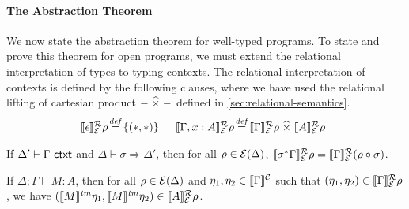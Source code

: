 \paragraph{The Abstraction Theorem}

We now state the abstraction theorem for well-typed programs. To state
and prove this theorem for open programs, we must extend the
relational interpretation of types to typing contexts. The relational
interpretation of contexts is defined by the following clauses, where
we have used the relational lifting of cartesian product $-\mathrel{\widehat\times}-$
defined in \autoref{sec:relational-semantics}.
\begin{displaymath}
  \begin{array}{@{}l@{\hspace{0.1em}\isDefinedAs\hspace{0.1em}}l@{\hspace{1.5em}}l@{\hspace{0.1em}\isDefinedAs\hspace{0.1em}}l}
    \rsem{\epsilon}{\relEnv{E}}{\rho} & \{(*,*)\} &
    \rsem{\Gamma, x : A}{\relEnv{E}}{\rho} & \rsem{\Gamma}{\relEnv{E}}\rho \relTimes \rsem{A}{\relEnv{E}}\rho
  \end{array}
\end{displaymath}
\begin{lemma}\label{lem:ctxtsubst-rel}
  If $\Delta' \vdash \Gamma \textsf{ ctxt}$ and $\Delta \vdash \sigma
  \Rightarrow \Delta'$, then for all $\rho \in \mathcal{E}(\Delta)$,
  $\llbracket \sigma^*\Gamma \rrbracket^{\mathcal{R}}_{\mathcal{E}}{\rho} =
  \llbracket \Gamma \rrbracket^{\mathcal{R}}_{\mathcal{E}}{(\rho \circ \sigma)}$.
\end{lemma}

\begin{theorem}[Abstraction]\label{thm:abstraction}
  If $\Delta; \Gamma \vdash M : A$, then for all $\rho \in
  \mathcal{E}(\Delta)$ and $\eta_1, \eta_2 \in \llbracket \Gamma \rrbracket^{\mathcal{C}}$ such
  that $(\eta_1, \eta_2) \in \llbracket \Gamma \rrbracket^{\mathcal{R}}_{\mathcal{E}}{\rho}$, we have
  $(\llbracket M \rrbracket^{\mathit{tm}}\eta_1, \llbracket M \rrbracket^{\mathit{tm}}\eta_2) \in \llbracket A \rrbracket^{\mathcal{R}}_{\mathcal{E}}{\rho}$.
\end{theorem}

